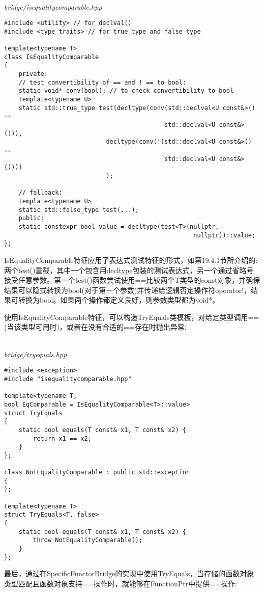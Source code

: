 \hspace*{\fill} \\ %
\noindent
\textit{bridge/isequalitycomparable.hpp}
\begin{lstlisting}[style=styleCXX]
#include <utility> // for declval()
#include <type_traits> // for true_type and false_type

template<typename T>
class IsEqualityComparable
{
	private:
	// test convertibility of == and ! == to bool:
	static void* conv(bool); // to check convertibility to bool
	template<typename U>
	static std::true_type test(decltype(conv(std::declval<U const&>() ==
											std::declval<U const&>())),
							decltype(conv(!(std::declval<U const&>() ==
											std::declval<U const&>())))
							);
	
	// fallback:
	template<typename U>
	static std::false_type test(...);
	public:
	static constexpr bool value = decltype(test<T>(nullptr,
													nullptr))::value;
};
\end{lstlisting}

IsEqualityComparable特征应用了表达式测试特征的形式，如第19.4.1节所介绍的:两个test()重载，其中一个包含用decltype包装的测试表达式，另一个通过省略号接受任意参数。第一个test()函数尝试使用==比较两个T类型的const对象，并确保结果可以隐式转换为bool(对于第一个参数)并传递给逻辑否定操作符operator!，结果可转换为bool。如果两个操作都定义良好，则参数类型都为void*。

使用IsEqualityComparable特征，可以构造TryEquals类模板，对给定类型调用==(当该类型可用时)，或者在没有合适的==存在时抛出异常:

\hspace*{\fill} \\ %
\noindent
\textit{bridge/tryequals.hpp}
\begin{lstlisting}[style=styleCXX]
#include <exception>
#include "isequalitycomparable.hpp"

template<typename T,
bool EqComparable = IsEqualityComparable<T>::value>
struct TryEquals
{
	static bool equals(T const& x1, T const& x2) {
		return x1 == x2;
	}
};

class NotEqualityComparable : public std::exception
{
};

template<typename T>
struct TryEquals<T, false>
{
	static bool equals(T const& x1, T const& x2) {
		throw NotEqualityComparable();
	}
};
\end{lstlisting}

最后，通过在SpecificFunctorBridge的实现中使用TryEquals，当存储的函数对象类型匹配且函数对象支持==操作时，就能够在FunctionPtr中提供==操作:

